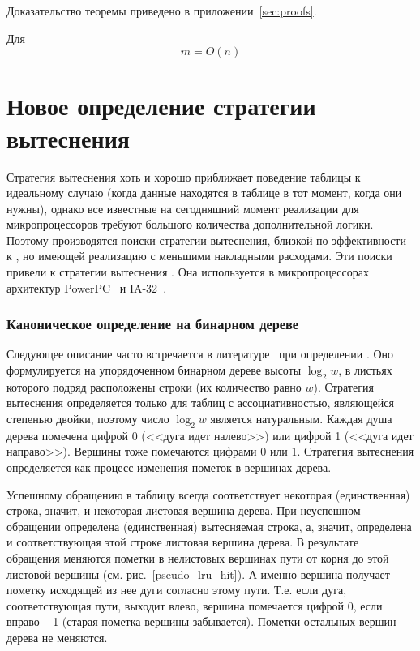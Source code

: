 \begin{theorem}\label{thm_mirror_lenth_lru} \UpperBoundLRUMirror
\end{theorem}
Доказательство теоремы приведено в приложении~\ref{sec:proofs}.
\begin{sld} Для \LRU
      $$m = O(n)$$
\end{sld}



\section{Новое определение стратегии вытеснения \PseudoLRU}\label{sec:plru_new_definition}

Стратегия вытеснения \LRU хоть и хорошо приближает поведение
таблицы к идеальному случаю (когда данные находятся в
таблице в тот момент, когда они нужны), однако все известные на
сегодняшний момент реализации \LRU для микропроцессоров требуют большого
количества дополнительной логики. Поэтому производятся поиски
стратегии вытеснения, близкой по эффективности к \LRU, но имеющей
реализацию с меньшими накладными расходами. Эти поиски привели к
стратегии вытеснения \PseudoLRU. Она используется в микропроцессорах архитектур
PowerPC~\cite{PowerPC} и IA-32~\cite{FundamentalOfComputerOrganizationAndDesign}.

\subsubsection{Каноническое определение \PseudoLRU на бинарном дереве}

Следующее описание часто встречается в
литературе~\cite{FundamentalOfComputerOrganizationAndDesign} при
определении \PseudoLRU. Оно формулируется на
упорядоченном бинарном дереве высоты $\log_2 w$, в листьях которого
подряд расположены строки (их количество равно $w$). Стратегия вытеснения
\PseudoLRU определяется только для таблиц с ассоциативностью, являющейся степенью двойки, поэтому число $\log_2 w$ является натуральным. Каждая душа дерева помечена цифрой 0 (<<дуга идет налево>>) или цифрой 1 (<<дуга идет направо>>). Вершины тоже помечаются цифрами 0 или 1. Стратегия вытеснения определяется как процесс изменения пометок в вершинах дерева.

Успешному обращению в таблицу всегда соответствует некоторая (единственная) строка, значит, и некоторая листовая вершина дерева. При неуспешном обращении определена (единственная) вытесняемая строка, а, значит, определена и соответствующая этой строке листовая вершина дерева. В результате обращения меняются пометки в нелистовых вершинах пути от корня до этой листовой вершины (см. рис.~\ref{pseudo_lru_hit}). А именно вершина получает пометку
исходящей из нее дуги согласно этому пути. Т.е. если дуга, соответствующая пути, выходит влево, вершина помечается цифрой 0, если вправо -- 1 (старая пометка вершины забывается). Пометки остальных вершин дерева не меняются.

